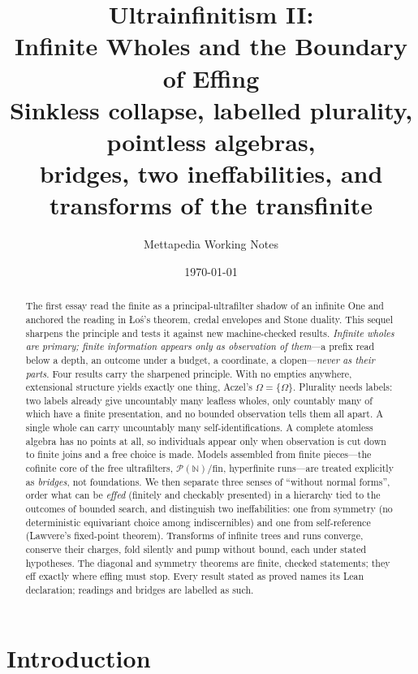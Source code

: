 \documentclass[]{article}
\title{Ultrainfinitism II:\\
       Infinite Wholes and the Boundary of Effing\\[4pt]
       {\large Sinkless collapse, labelled plurality, pointless algebras,\\
        bridges, two ineffabilities, and transforms of the transfinite}}
\author{Mettapedia Working Notes}
\date{\today}
\theoremstyle{definition}
\theoremstyle{remark}
\newcommand{\N}{\mathbb{N}}
\newcommand{\Om}{\Omega}
\newcommand{\Pfin}{\mathcal{P}(\N)/\mathrm{fin}}
\begin{document}
\maketitle

\begin{abstract}
The first essay read the finite as a principal-ultrafilter shadow of an infinite One and
anchored the reading in {\L}o\'s's theorem, credal envelopes and Stone duality. This sequel
sharpens the principle and tests it against new machine-checked results. \emph{Infinite wholes
are primary; finite information appears only as observation of them}---a prefix read below a
depth, an outcome under a budget, a coordinate, a clopen---\emph{never as their parts}. Four
results carry the sharpened principle. With no empties anywhere, extensional structure yields
exactly one thing, Aczel's $\Om=\{\Om\}$. Plurality needs labels: two labels already give
uncountably many leafless wholes, only countably many of which have a finite presentation, and no
bounded observation tells them all apart. A single whole can carry uncountably many
self-identifications. A complete atomless algebra has no points at all, so individuals appear only
when observation is cut down to finite joins and a free choice is made. Models assembled from
finite pieces---the cofinite core of the free ultrafilters, $\Pfin$, hyperfinite runs---are
treated explicitly as \emph{bridges}, not foundations. We then separate three senses of ``without
normal forms'', order what can be \emph{effed} (finitely and checkably presented) in a hierarchy
tied to the outcomes of bounded search, and distinguish two ineffabilities: one from symmetry (no
deterministic equivariant choice among indiscernibles) and one from self-reference (Lawvere's fixed-point
theorem). Transforms of infinite trees and runs converge, conserve their charges, fold silently and
pump without bound, each under stated hypotheses. The diagonal and symmetry theorems are finite,
checked statements; they eff exactly where effing must stop. Every result stated as proved names
its Lean declaration; readings and bridges are labelled as such.
\end{abstract}

\tableofcontents

\section{Introduction}
\label{sec:intro}
\end{document}
